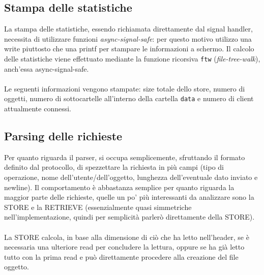 \subsection{Stampa delle statistiche}
\begin{flushleft}

La stampa delle statistiche, essendo richiamata direttamente dal signal handler, necessita di utilizzare funzioni \emph{async-signal-safe}: per questo motivo utilizzo una write piuttosto che una printf per stampare le informazioni a schermo.
Il calcolo delle statistiche viene effettuato mediante la funzione ricorsiva \texttt{ftw} (\emph{file-tree-walk}), anch'essa async-signal-safe.
\\~\\
Le seguenti informazioni vengono stampate: size totale dello store, numero di oggetti, numero di sottocartelle all'interno della cartella \texttt{data} e numero di client attualmente connessi.  
\end{flushleft}

\newpage

\subsection{Parsing delle richieste}
\begin{flushleft}
Per quanto riguarda il parser, si occupa semplicemente, sfruttando il formato definito dal protocollo, di spezzettare la richiesta in più campi (tipo di operazione, nome dell'utente/dell'oggetto, lunghezza dell'eventuale dato inviato e newline). Il comportamento è abbastanza semplice per quanto riguarda la maggior parte delle richieste, quelle un po' più interessanti da analizzare sono la STORE e la RETRIEVE (essenzialmente quasi simmetriche nell'implementazione, quindi per semplicità parlerò direttamente della STORE).\\~\\

La STORE calcola, in base alla dimensione di ciò che ha letto nell'header, se è necessaria una ulteriore read per concludere la lettura, oppure se ha già letto tutto con la prima read e può direttamente procedere alla creazione del file oggetto.
 

\end{flushleft}

